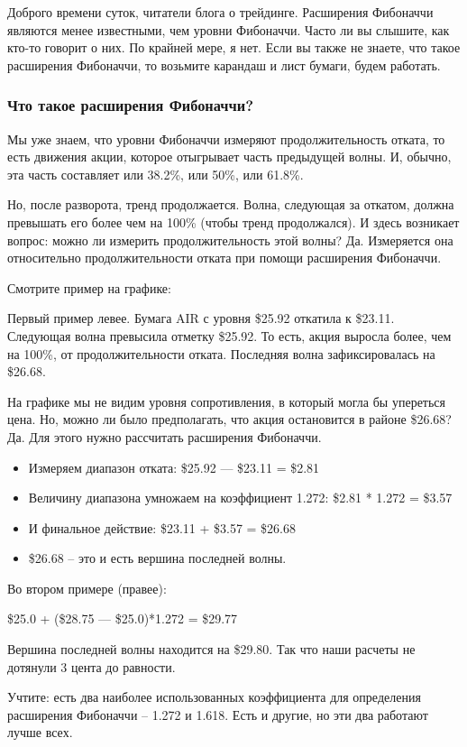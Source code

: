 \documentclass{book}
\begin{document}
Доброго времени суток, читатели блога о трейдинге. Расширения
Фибоначчи являются менее известными, чем уровни Фибоначчи. Часто ли вы
слышите, как кто-то говорит о них. По крайней мере, я нет. Если вы
также не знаете, что такое расширения Фибоначчи, то возьмите карандаш
и лист бумаги, будем работать.

\subsubsection{Что такое расширения Фибоначчи?}

Мы уже знаем, что уровни Фибоначчи измеряют продолжительность отката, то есть движения акции, которое отыгрывает часть предыдущей волны. И, обычно, эта часть составляет или 38.2\%, или 50\%, или 61.8\%.

Но, после разворота, тренд продолжается. Волна, следующая за откатом, должна превышать его более чем на 100\% (чтобы тренд продолжался). И здесь возникает вопрос: можно ли измерить продолжительность этой волны? Да. Измеряется она относительно продолжительности отката при помощи расширения Фибоначчи.

Смотрите пример на графике:

Первый пример левее. Бумага AIR с уровня \$25.92 откатила к \$23.11. Следующая волна превысила отметку \$25.92. То есть, акция выросла более, чем на 100\%, от продолжительности отката. Последняя волна зафиксировалась на \$26.68.

На графике мы не видим уровня сопротивления, в который могла бы упереться цена. Но, можно ли было предполагать, что акция остановится в районе \$26.68? Да. Для этого нужно рассчитать расширения Фибоначчи.
\begin{itemize}
\item     Измеряем диапазон отката: \$25.92 — \$23.11 = \$2.81
\item     Величину диапазона умножаем на коэффициент 1.272: \$2.81 * 1.272 = \$3.57
\item     И финальное действие: \$23.11 + \$3.57 = \$26.68
\item     \$26.68 – это и есть вершина последней волны.
\end{itemize}

Во втором примере (правее):

\$25.0 + (\$28.75 — \$25.0)*1.272 = \$29.77

Вершина последней волны находится на \$29.80. Так что наши расчеты не дотянули 3 цента до равности.

Учтите: есть два наиболее использованных коэффициента для определения расширения Фибоначчи – 1.272 и 1.618. Есть и другие, но эти два работают лучше всех.
\end{document}
